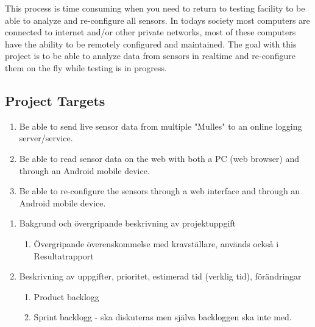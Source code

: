 This process is time consuming when you need to return to testing facility to be able to analyze and re-configure all sensors.
In todays society most computers are connected to internet and/or other private networks, most of these computers have the ability to be remotely configured and maintained.
The goal with this project is to be able to analyze data from sensors in realtime and re-configure them on the fly while testing is in progress.
\subsection{Project Targets}
\begin{enumerate}
\item Be able to send live sensor data from multiple "Mulles" to an online logging server/service.
\item Be able to read sensor data on the web with both a PC (web browser) and through an Android mobile device.
\item Be able to re-configure the sensors through a web interface and through an Android mobile device.
\end{enumerate}


%
%
%
%
\pagebreak
\begin{enumerate}
\item Bakgrund och övergripande beskrivning av projektuppgift
\begin{enumerate}
\item Övergripande överenskommelse med kravställare, används också i Resultatrapport
\end{enumerate} 
\item Beskrivning av uppgifter, prioritet, estimerad tid (verklig tid), förändringar
\begin{enumerate}
\item Product backlogg 
\item Sprint backlogg - ska diskuteras men själva backloggen ska inte med.
\end{enumerate} 
\end{enumerate}
